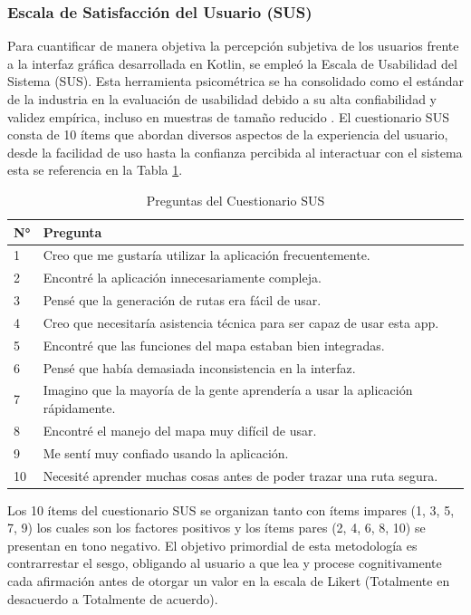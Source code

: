 \subsubsection{Escala de Satisfacción del Usuario (SUS)}
Para cuantificar de manera objetiva la percepción subjetiva de los usuarios frente a la interfaz gráfica desarrollada en Kotlin, se empleó la Escala de Usabilidad del Sistema (SUS). Esta herramienta psicométrica se ha consolidado como el estándar de la industria en la evaluación de usabilidad debido a su alta confiabilidad y validez empírica, incluso en muestras de tamaño reducido \cite{brooke1996sus}. El cuestionario SUS consta de 10 ítems que abordan diversos aspectos de la experiencia del usuario, desde la facilidad de uso hasta la confianza percibida al interactuar con el sistema esta se referencia en la Tabla \ref{tab:preguntas_sus}.
\begin{table}[H]
\caption{Preguntas del Cuestionario SUS}\label{tab:preguntas_sus}
\begin{tabular}{|p{2cm}|p{12cm}|}
\hline
\textbf{N°} & \textbf{Pregunta} \\ \hline
1 & Creo que me gustaría utilizar la aplicación frecuentemente. \\ \hline
2 & Encontré la aplicación innecesariamente compleja. \\ \hline
3 & Pensé que la generación de rutas era fácil de usar. \\ \hline
4 & Creo que necesitaría asistencia técnica para ser capaz de usar esta app. \\ \hline
5 & Encontré que las funciones del mapa estaban bien integradas. \\ \hline
6 & Pensé que había demasiada inconsistencia en la interfaz. \\ \hline
7 & Imagino que la mayoría de la gente aprendería a usar la aplicación rápidamente. \\ \hline
8 & Encontré el manejo del mapa muy difícil de usar. \\ \hline
9 & Me sentí muy confiado usando la aplicación. \\ \hline
10 & Necesité aprender muchas cosas antes de poder trazar una ruta segura. \\ \hline
\end{tabular}
\end{table}


Los 10 ítems del cuestionario SUS se organizan tanto con ítems impares (1, 3, 5, 7, 9)  los cuales son  los factores positivos y los ítems pares (2, 4, 6, 8, 10) se presentan en tono negativo. El objetivo primordial de esta metodología es contrarrestar el sesgo, obligando al usuario a que lea y procese cognitivamente cada afirmación antes de otorgar un valor en la escala de Likert (Totalmente en desacuerdo a Totalmente de acuerdo).

